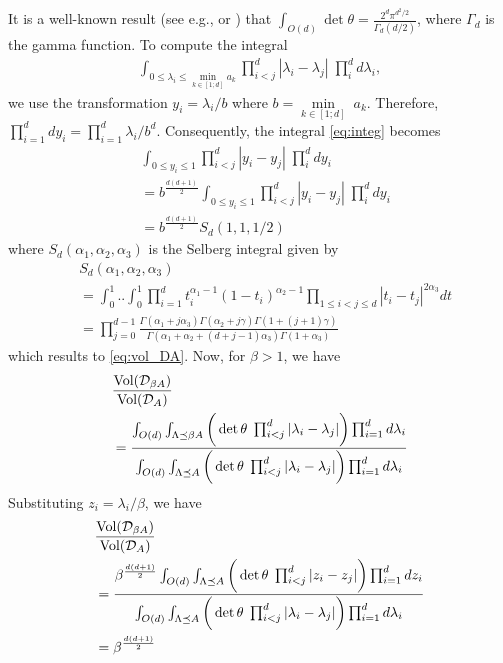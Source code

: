 \documentclass[Afour,sageh,times]{sagej}
\begin{document}
It is a well-known result (see e.g., \cite[page 71]{muirhead2009aspects} or \cite{chikuse2003statistics} ) that $\int_{O(d)} \det \theta= \frac{2^d \pi^{d^2/2}}{\Gamma_d(d/2)}$, where $\Gamma_d$ is the gamma function. To compute the integral
\begin{align}
\label{eq:integ}
    \int_{0 \leq \lambda_i \leq \underset{k\in[1;d]}{\min}a_k}    \prod_{i<j}^d |\lambda_i-\lambda_j| \; \prod_i^d d\lambda_i,
\end{align}
we use the transformation $y_i=\lambda_i/b$ where $b=\underset{k\in[1;d]}{\min}\;a_k$. Therefore, $\prod_{i=1}^ddy_i=\prod_{i=1}^d\lambda_i/b^d$. Consequently, the integral \eqref{eq:integ} becomes
\begin{align}
    &\int_{0 \leq y_i \leq 1}    \prod_{i<j}^d |y_i-y_j| \; \prod_i^d dy_i\nonumber\\
    &=b^{\frac{d(d+1)}{2}}\int_{0 \leq y_i \leq 1}    \prod_{i<j}^d |y_i-y_j| \; \prod_i^d dy_i\nonumber\\
    &=b^{\frac{d(d+1)}{2}}S_d(1,1,1/2)
\end{align}
where $S_d(\alpha_1,\alpha_2,\alpha_3)$ is the Selberg integral \cite{grafakos1999selberg} given by
\begin{align}
     &S_d(\alpha_1, \alpha_2, \alpha_3)\nonumber\\
     &=\int_0^1 .. \int_0^1 \prod_{i=1}^d t_i^{\alpha_1-1}\left(1-t_i\right)^{\alpha_2-1} \prod_{1 \leq i<j \leq d}\left|t_i-t_j\right|^{2 \alpha_3} d t \nonumber \\ 
     & =\prod_{j=0}^{d-1} \frac{\Gamma(\alpha_1+j \alpha_3) \Gamma(\alpha_2+j \gamma) \Gamma(1+(j+1) \gamma)}{\Gamma(\alpha_1+\alpha_2+(d+j-1) \alpha_3) \Gamma(1+\alpha_3)}\nonumber
\end{align}
which results to \eqref{eq:vol_DA}. Now, for $\beta>1$, we have
\begin{align}
     &\frac{\textup{Vol}(\mathcal{D}_{\beta A})}{\textup{Vol}(\mathcal{D}_A)}\nonumber\\
     &=\frac{\int_{O(d)} \int_{\Lambda\preceq \beta A}\bigg(\det \theta \;   \prod_{i<j}^d |\lambda_i-\lambda_j|\bigg) \prod_{i=1}^d d\lambda_i}{\int_{O(d)} \int_{\Lambda\preceq A}\bigg(\det \theta \;   \prod_{i<j}^d |\lambda_i-\lambda_j|\bigg) \prod_{i=1}^d d\lambda_i}
\end{align}
Substituting $z_i= \lambda_i/\beta$, we have
\begin{align}
    &\frac{\textup{Vol}(\mathcal{D}_{\beta A})}{\textup{Vol}(\mathcal{D}_A)}\nonumber\\
     &=\frac{\beta^{\frac{d(d+1)}{2}}\int_{O(d)} \int_{\Lambda\preceq A}\bigg(\det \theta \;   \prod_{i<j}^d |z_i-z_j|\bigg) \prod_{i=1}^d dz_i}{\int_{O(d)} \int_{\Lambda\preceq A}\bigg(\det \theta \;   \prod_{i<j}^d |\lambda_i-\lambda_j|\bigg) \prod_{i=1}^d d\lambda_i}\nonumber\\
     &=\beta^{\frac{d(d+1)}{2}}
\end{align}
\end{document}
